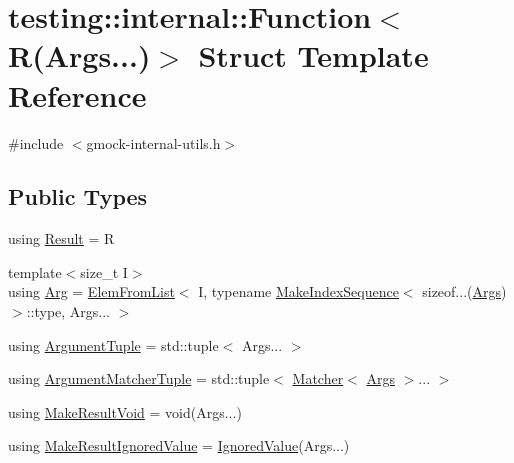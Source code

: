 \hypertarget{structtesting_1_1internal_1_1_function_3_01_r_07_args_8_8_8_08_4}{}\section{testing\+::internal\+::Function$<$ R(Args...)$>$ Struct Template Reference}
\label{structtesting_1_1internal_1_1_function_3_01_r_07_args_8_8_8_08_4}


{\ttfamily \#include $<$gmock-\/internal-\/utils.\+h$>$}

\subsection*{Public Types}
\begin{DoxyCompactItemize}
\item 
using \mbox{\hyperlink{structtesting_1_1internal_1_1_function_3_01_r_07_args_8_8_8_08_4_a71efbc408f9ce64e36e2cc41df0da194}{Result}} = R
\item 
{\footnotesize template$<$size\+\_\+t I$>$ }\\using \mbox{\hyperlink{structtesting_1_1internal_1_1_function_3_01_r_07_args_8_8_8_08_4_a2f31086b21cd71eb6c855b2835c16878}{Arg}} = \mbox{\hyperlink{structtesting_1_1internal_1_1_elem_from_list}{Elem\+From\+List}}$<$ I, typename \mbox{\hyperlink{structtesting_1_1internal_1_1_make_index_sequence}{Make\+Index\+Sequence}}$<$ sizeof...(\mbox{\hyperlink{namespacetesting_aaca153f67b689b8b9d5b8c67ecf8cee4}{Args}})$>$\+::type, Args... $>$
\item 
using \mbox{\hyperlink{structtesting_1_1internal_1_1_function_3_01_r_07_args_8_8_8_08_4_afc6bddfcfc78f9308c268123ebc2a99b}{Argument\+Tuple}} = std\+::tuple$<$ Args... $>$
\item 
using \mbox{\hyperlink{structtesting_1_1internal_1_1_function_3_01_r_07_args_8_8_8_08_4_aa1b4dca988b45fea2307518af5ac8a09}{Argument\+Matcher\+Tuple}} = std\+::tuple$<$ \mbox{\hyperlink{classtesting_1_1_matcher}{Matcher}}$<$ \mbox{\hyperlink{namespacetesting_aaca153f67b689b8b9d5b8c67ecf8cee4}{Args}} $>$... $>$
\item 
using \mbox{\hyperlink{structtesting_1_1internal_1_1_function_3_01_r_07_args_8_8_8_08_4_a763920d3647641e1100bc4ade26d1d0c}{Make\+Result\+Void}} = void(Args...)
\item 
using \mbox{\hyperlink{structtesting_1_1internal_1_1_function_3_01_r_07_args_8_8_8_08_4_a23361a5e5eb49aad2e1dfe784e60b5da}{Make\+Result\+Ignored\+Value}} = \mbox{\hyperlink{classtesting_1_1internal_1_1_ignored_value}{Ignored\+Value}}(Args...)

\end{DoxyCompactItemize}
